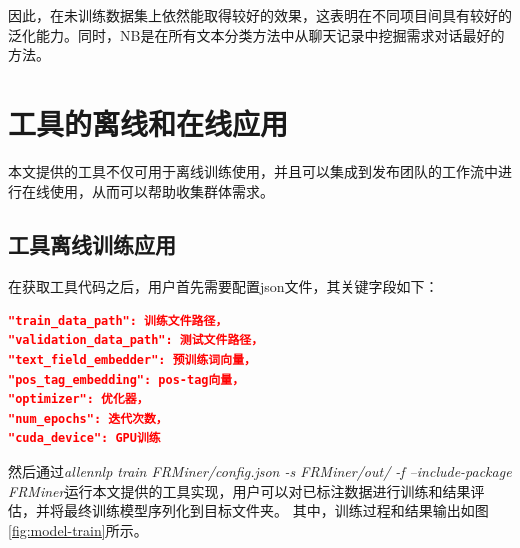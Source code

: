 因此，{\tool}在未训练数据集上依然能取得较好的效果，这表明{\tool}在不同项目间具有较好的泛化能力。同时，NB是在所有文本分类方法中从聊天记录中挖掘需求对话最好的方法。

\section{{\tool}工具的离线和在线应用}

本文提供的{\tool}工具不仅可用于离线训练使用，并且可以集成到发布团队的工作流中进行在线使用，从而可以帮助收集群体需求。

\subsection{{\tool}工具离线训练应用}
在获取{\tool}工具代码之后，用户首先需要配置json文件，其关键字段如下：
\begin{lstlisting}[language = json]
"train_data_path": 训练文件路径，
"validation_data_path": 测试文件路径，
"text_field_embedder": 预训练词向量，
"pos_tag_embedding": pos-tag向量，
"optimizer": 优化器，
"num_epochs": 迭代次数，
"cuda_device": GPU训练
\end{lstlisting}
然后通过\textit{allennlp train FRMiner/config.json -s FRMiner/out/ -f --include-package FRMiner}运行本文提供的{\tool}工具实现，用户可以对已标注数据进行训练和结果评估，并将最终训练模型序列化到目标文件夹。
其中，训练过程和结果输出如图\ref{fig:model-train}所示。

